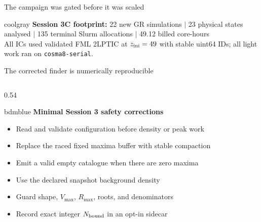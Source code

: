 \documentclass[UTF8]{beamer}
\newcommand{\source}[1]{}
\begin{document}
\begin{frame}{The campaign was gated before it was scaled}
  \vfill

  \begin{phasebox}[colback=bdmpale,top=1.0mm,bottom=1.0mm]{coolgray}
    \centering
    \textbf{Session 3C footprint:}
    22 new GR simulations $\vert$ 23 physical states analysed $\vert$
    135 terminal Slurm allocations $\vert$ 49.12 billed core-hours\\[0.5ex]
    All ICs used validated FML 2LPTIC at $z_{\rm ini}=49$ with stable uint64 IDs;
    all light work ran on \texttt{cosma8-serial}.
  \end{phasebox}
  \source{Frozen evidence: \texttt{results/bdm\_convergence/manifest.json}}
\end{frame}

\begin{frame}{The corrected finder is numerically reproducible}
  \footnotesize
  \begin{columns}[T,totalwidth=\textwidth]
    \begin{column}{0.54\textwidth}
      \begin{phasebox}{bdmblue}
        {\color{bdmblue}\bfseries Minimal Session 3 safety corrections}\par\smallskip
        \begin{itemize}\setlength\itemsep{0.15em}
          \item Read and validate configuration before density or peak work
          \item Replace the raced fixed maxima buffer with stable compaction
          \item Emit a valid empty catalogue when there are zero maxima
          \item Use the declared snapshot background density
          \item Guard shape, $V_{\max}$, $R_{\max}$, roots, and denominators
          \item Record exact integer $N_{\rm bound}$ in an opt-in sidecar
        \end{itemize}
      \end{phasebox}


\end{column}
\end{columns}
\end{frame}
\end{document}
